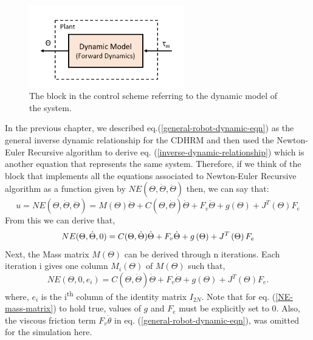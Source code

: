 \documentclass[a4paper,12pt]{report}
\begin{document}
\begin{figure}
	\centering
	\vspace{-20pt}
	\includegraphics[width=0.6\textwidth]{images/Dynamic Model.png}
	\caption{The block in the control scheme referring to the dynamic model of the system.}
	\label{dynamic-model-implementation}
\end{figure}
In the previous chapter, we described eq.(\ref{general-robot-dynamic-eqn}) as the general inverse dynamic relationship for the CDHRM and then used the Newton-Euler Recursive algorithm to derive eq. (\ref{inverse-dynamic-relationship}) which is another equation that represents the same system. Therefore, if we think of the block that implements all the equations associated to Newton-Euler Recursive algorithm as a function given by $ NE(\Theta,\dot{\Theta},\ddot{\Theta}) $ then, we can say that: 
\begin{equation*}
u=NE(\Theta,\dot{\Theta},\ddot{\Theta})=M\left(\Theta\right)\ddot{\Theta} + C(\Theta,\dot{\Theta})\dot{\Theta}+ F_v\dot{\Theta} + g\left(\Theta\right) + J^{T}\left(\Theta\right)F_e
\end{equation*}
From this we can derive that, 
\begin{equation}
\label{NE-other-terms}
NE(\Theta,\dot{\Theta},0)= C(\Theta,\dot{\Theta})\dot{\Theta}+ F_v\dot{\Theta} + g\left(\Theta\right) + J^{T}\left(\Theta\right)F_e \\
\end{equation}
Next, the Mass matrix $ M(\Theta) $ can be derived through n iterations. Each iteration i gives one column $ M_i(\Theta) $ of $ M(\Theta) $ such that, 
\begin{equation}
\label{NE-mass-matrix}
	NE(\Theta,0,e_i)= C(\Theta,\dot{\Theta})\dot{\Theta}+ F_v\dot{\Theta} + g\left(\Theta\right) + J^{T}\left(\Theta\right)F_e.
\end{equation}
where, $ e_i $ is the i\textsuperscript{th} column of the identity matrix $ I_{2N} $.
Note that for eq. (\ref{NE-mass-matrix}) to hold true, values of $ g $ and $ F_e $ must be explicitly set to 0. Also, the viscous friction term $ F_v \dot{\theta} $ in eq. (\ref{general-robot-dynamic-eqn}), was omitted for the simulation here.
\end{document}
